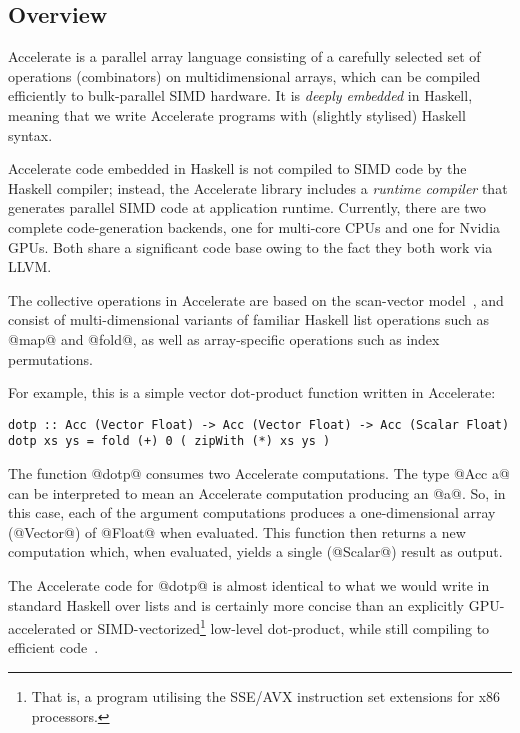 \subsection{Overview}
\label{sec:acc-intro}

Accelerate is a parallel array language consisting of a carefully selected set of operations (combinators) on multidimensional arrays, which can be compiled efficiently to bulk-parallel SIMD hardware. It is \emph{deeply embedded} in Haskell, meaning that we write Accelerate programs with (slightly stylised) Haskell syntax.

Accelerate code embedded in Haskell is not compiled to SIMD code by the Haskell compiler; instead, the Accelerate library includes a \emph{runtime compiler} that generates parallel SIMD code at application runtime. Currently, there are two complete code-generation backends, one for multi-core CPUs and one for Nvidia GPUs. Both share a significant code base owing to the fact they both work via LLVM.

The collective operations in Accelerate are based on the scan-vector model~\citep{Chatterjee:1990vj,Sengupta:2007tc}, and consist of multi-dimensional variants of familiar Haskell list operations such as @map@ and @fold@, as well as array-specific operations such as index permutations.

For example, this is a simple vector dot-product function written in Accelerate:
%
\begin{lstlisting}
dotp :: Acc (Vector Float) -> Acc (Vector Float) -> Acc (Scalar Float)
dotp xs ys = fold (+) 0 ( zipWith (*) xs ys )
\end{lstlisting}
%
The function @dotp@ consumes two Accelerate computations. The type @Acc a@ can be interpreted to mean an Accelerate computation producing an @a@. So, in this case, each of the argument computations produces a one-dimensional array (@Vector@) of @Float@ when evaluated. This function then returns a new computation which, when evaluated, yields a single (@Scalar@) result as output.

The Accelerate code for @dotp@ is almost identical to what we would write in standard Haskell over lists and is certainly more concise than an explicitly GPU-accelerated or SIMD-vectorized\footnote{That is, a program utilising the SSE/AVX instruction set extensions for x86 processors.} low-level dot-product, while still compiling to efficient code~\citep{Chakravarty:acc-cuda,McDonell:acc-optim,McDonell:2015:acc-llvm}.

